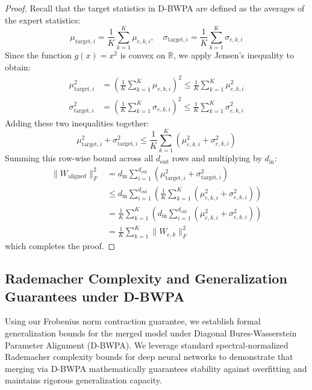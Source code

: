 \documentclass{article}
\theoremstyle{plain}
\theoremstyle{definition}
\theoremstyle{remark}
\begin{document}
\begin{proof}
Recall that the target statistics in D-BWPA are defined as the averages of the expert statistics:
\begin{equation}
  \mu_{\mathrm{target}, i} = \frac{1}{K} \sum_{k=1}^K \mu_{e, k, i}, \quad \sigma_{\mathrm{target}, i} = \frac{1}{K} \sum_{k=1}^K \sigma_{e, k, i}
\end{equation}
Since the function $g(x) = x^2$ is convex on $\mathbb{R}$, we apply Jensen's inequality to obtain:
\begin{align}
  \mu_{\mathrm{target}, i}^2 &= \left( \frac{1}{K} \sum_{k=1}^K \mu_{e, k, i} \right)^2 \le \frac{1}{K} \sum_{k=1}^K \mu_{e, k, i}^2 \\
  \sigma_{\mathrm{target}, i}^2 &= \left( \frac{1}{K} \sum_{k=1}^K \sigma_{e, k, i} \right)^2 \le \frac{1}{K} \sum_{k=1}^K \sigma_{e, k, i}^2
\end{align}
Adding these two inequalities together:
\begin{equation}
  \mu_{\mathrm{target}, i}^2 + \sigma_{\mathrm{target}, i}^2 \le \frac{1}{K} \sum_{k=1}^K \left( \mu_{e, k, i}^2 + \sigma_{e, k, i}^2 \right)
\end{equation}
Summing this row-wise bound across all $d_{\mathrm{out}}$ rows and multiplying by $d_{\mathrm{in}}$:
\begin{equation}
\begin{split}
  \|W_{\mathrm{aligned}}\|_F^2 &= d_{\mathrm{in}} \sum_{i=1}^{d_{\mathrm{out}}} \left( \mu_{\mathrm{target}, i}^2 + \sigma_{\mathrm{target}, i}^2 \right) \\
  &\le d_{\mathrm{in}} \sum_{i=1}^{d_{\mathrm{out}}} \left( \frac{1}{K} \sum_{k=1}^K \left( \mu_{e, k, i}^2 + \sigma_{e, k, i}^2 \right) \right) \\
  &= \frac{1}{K} \sum_{k=1}^K \left( d_{\mathrm{in}} \sum_{i=1}^{d_{\mathrm{out}}} \left( \mu_{e, k, i}^2 + \sigma_{e, k, i}^2 \right) \right) \\
  &= \frac{1}{K} \sum_{k=1}^K \|W_{e, k}\|_F^2
\end{split}
\end{equation}
which completes the proof.
\end{proof}

\subsection{Rademacher Complexity and Generalization Guarantees under D-BWPA}
Using our Frobenius norm contraction guarantee, we establish formal generalization bounds for the merged model under Diagonal Bures-Wasserstein Parameter Alignment (D-BWPA). We leverage standard spectral-normalized Rademacher complexity bounds for deep neural networks \cite{bartlett2017spectrally} to demonstrate that merging via D-BWPA mathematically guarantees stability against overfitting and maintains rigorous generalization capacity.
\end{document}
